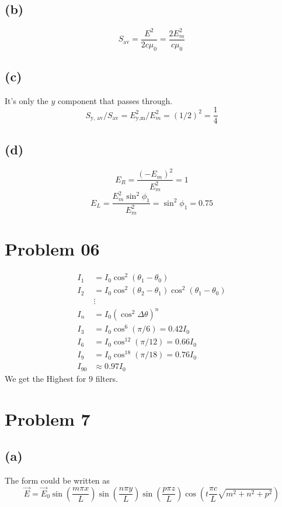\documentclass[a4paper]{article}
\begin{document}
\subsection*{(b)} 
\[
S_\text{av} = \frac{E^2}{2 c \mu_0} = \frac{2 E_m ^2}{c \mu_0}
\]

\subsection*{(c)} 
It's only the $y$ component that passes through. 
\[
S_\text{y, av} / S_\text{av} = E_\text{y,m}^2 / E_m^2 = (1 / 2)^2 = \frac{1}{4}
\] 

\subsection*{(d)} 
\[
E_R = \frac{(-E_m)^2}{E_m^2} = 1
\] 
\[
E_L = \frac{E_m ^2 \sin ^2 \phi_1}{E_m ^2} = \sin ^2 \phi_1 = 0.75
\] 

\section*{Problem 06} 
\begin{align*}
	I_1 &= I_0 \cos ^2 (\theta_1 - \theta_0) \\
	I_2 &= I_0 \cos ^2 (\theta_2 - \theta_1) \cos ^2 (\theta_1 - \theta_0) \\
	    & \vdots \\ 
	I_n &= I_0 (\cos ^2 \Delta \theta)^{n} \tag{$\Delta \theta = \theta_2 - \theta_1 = \theta_1 - \theta_0 $ } \\
	I_3 &= I_0 \cos^{6} (\pi / 6) = 0.42 I_0 \\
	I_6 &= I_0 \cos^{12}(\pi / 12) = 0.66 I_0 \\
	I_9 &= I_0 \cos^{18} (\pi /18) = 0.76 I_0 \\
	I_{90} & \approx 0.97 I_0 \tag{using relevant approximations}
\end{align*}
We get the Highest for $9$ filters. 


\section*{Problem 7} 
\subsection*{(a)} 
The form could be written as
\[
\vec{E} = 
\vec{E}_0 \sin \left(\frac{m \pi x}{L}\right)
\sin \left(\frac{n \pi y}{L}\right)
\sin \left(\frac{p \pi z}{L}\right) 
\cos \left(t \frac{\pi c}{L} \sqrt{m^2 + n^2 + p^2} \right)
\] 
\end{document}
